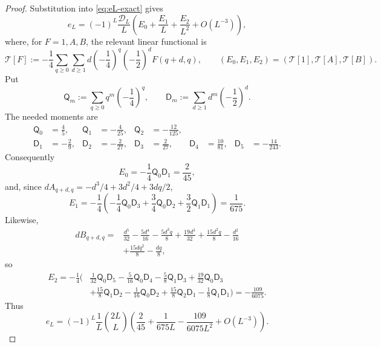 \documentclass[10pt,a4paper]{amsart}
\begin{document}
\begin{proof}
Substitution into \eqref{eq:eL-exact} gives
\begin{equation}
 e_L=(-1)^L\frac{\mathscr D_L}{L}
 \left(E_0+\frac{E_1}{L}+\frac{E_2}{L^2}+O(L^{-3})\right),
 \label{eq:eL-three-coefficients-pre}
\end{equation}
where, for \(F=1,A,B\), the relevant linear functional is
\begin{equation}
 \mathcal T[F]
 :=-\frac14\sum_{q\ge0}\sum_{d\ge1}
 d\left(-\frac14\right)^q
 \left(-\frac12\right)^dF(q+d,q),
 \qquad
 (E_0,E_1,E_2)=(\mathcal T[1],\mathcal T[A],\mathcal T[B]).
 \label{eq:eL-corner-functional}
\end{equation}
Put
\[
 \mathsf Q_m:=\sum_{q\ge0}q^m\left(-\frac14\right)^q,
 \qquad
 \mathsf D_m:=\sum_{d\ge1}d^m\left(-\frac12\right)^d.
\]
The needed moments are
\begin{align*}
 \mathsf Q_0&=\frac45,&
 \mathsf Q_1&=-\frac4{25},&
 \mathsf Q_2&=-\frac{12}{125},\\
 \mathsf D_1&=-\frac29,&
 \mathsf D_2&=-\frac2{27},&
 \mathsf D_3&=\frac2{27},&
 \mathsf D_4&=\frac{10}{81},&
 \mathsf D_5&=-\frac{14}{243}.
\end{align*}
Consequently
\[
 E_0=-\frac14\mathsf Q_0\mathsf D_1=\frac2{45},
\]
and, since
\(dA_{q+d,q}=-d^3/4+3d^2/4+3dq/2\),
\begin{equation}
 E_1=-\frac14\left(
 -\frac14\mathsf Q_0\mathsf D_3
 +\frac34\mathsf Q_0\mathsf D_2
 +\frac32\mathsf Q_1\mathsf D_1\right)
 =\frac1{675}.
 \label{eq:eL-E1-evaluation}
\end{equation}
Likewise,
\begin{align*}
 dB_{q+d,q}={}&
 \frac{d^5}{32}-\frac{5d^4}{16}
 -\frac{5d^3q}{8}+\frac{19d^3}{32}
 +\frac{15d^2q}{8}-\frac{d^2}{16}\\
 &+\frac{15dq^2}{8}-\frac{dq}{8},
\end{align*}
so
\begin{align}
 E_2=-\frac14\bigg(&
 \frac1{32}\mathsf Q_0\mathsf D_5
 -\frac5{16}\mathsf Q_0\mathsf D_4
 -\frac58\mathsf Q_1\mathsf D_3
 +\frac{19}{32}\mathsf Q_0\mathsf D_3\nonumber\\
 &+\frac{15}{8}\mathsf Q_1\mathsf D_2
 -\frac1{16}\mathsf Q_0\mathsf D_2
 +\frac{15}{8}\mathsf Q_2\mathsf D_1
 -\frac18\mathsf Q_1\mathsf D_1\bigg)
 =-\frac{109}{6075}.
 \label{eq:eL-E2-evaluation}
\end{align}
Thus
\begin{equation}
 {
 e_L=(-1)^L\frac1L\binom{2L}{L}
 \left(
 \frac2{45}+\frac{1}{675L}
 -\frac{109}{6075L^2}+O(L^{-3})\right).}
 \label{eq:eL-second}
\end{equation}


\end{proof}
\end{document}
